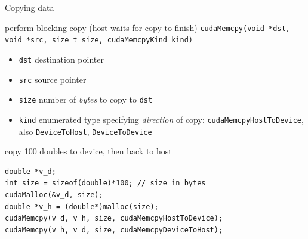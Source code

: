 \documentclass[aspectratio=43]{beamer}
\newcommand{\lst}[1]{\lstinline!#1!}
\begin{document}
\begin{frame}[fragile]{Copying data}

    \begin{info}{perform blocking copy (host waits for copy to finish)}
        \centering \lst{cudaMemcpy(void *dst, void *src, size_t size, cudaMemcpyKind kind)}
    \begin{itemize}
        \item \lst{dst} destination pointer
        \item \lst{src} source pointer
        \item \lst{size} number of \emph{bytes} to copy to \lst{dst}
        \item \lst{kind} enumerated type specifying \emph{direction} of copy:
            \lst{cudaMemcpyHostToDevice}, also \lst{DeviceToHost}, \lst{DeviceToDevice}
    \end{itemize}
    \end{info}

    \begin{code}{copy 100 doubles to device, then back to host}
        \begin{lstlisting}[style=boxcuda]
double *v_d;
int size = sizeof(double)*100; // size in bytes
cudaMalloc(&v_d, size);
double *v_h = (double*)malloc(size);
cudaMemcpy(v_d, v_h, size, cudaMemcpyHostToDevice);
cudaMemcpy(v_h, v_d, size, cudaMemcpyDeviceToHost);
\end{lstlisting}
    \end{code}
\end{frame}
\end{document}
